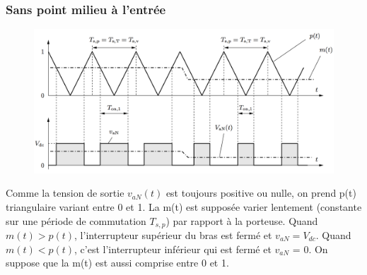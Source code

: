 	 	\subsubsection{Sans point milieu à l'entrée}
	 		\begin{figure}
			\vspace{-5mm}
			\includegraphics[scale=0.2]{ch4/6}
			\end{figure}
			Comme la tension de sortie $v_{aN}(t)$ est toujours positive ou nulle, on prend p(t) triangulaire variant entre 0 et 1. La m(t) est supposée varier lentement (constante sur une période de commutation $T_{s,p}$) par rapport à la porteuse. Quand $m(t) > p(t)$, l'interrupteur supérieur du bras est fermé et $v_{aN} = V_{dc}$. Quand $m(t) < p(t)$, c'est l'interrupteur inférieur qui est fermé et $v_{aN}$ = 0. On suppose que la m(t) est aussi comprise entre 0 et 1.  